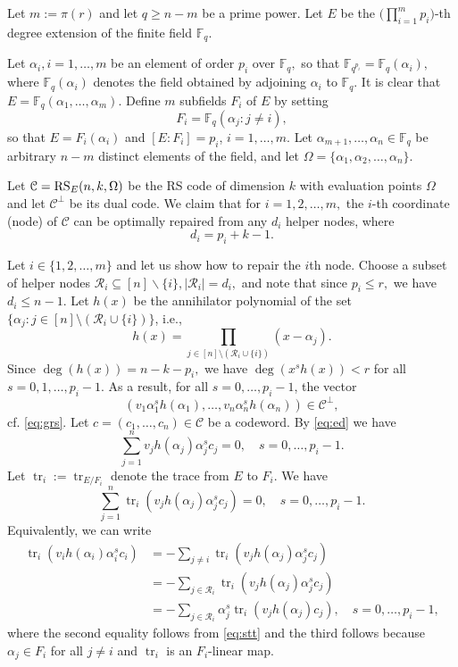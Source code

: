 \documentclass[11pt,onecolumn]{IEEEtran}
\newcommand{\cC}{\mathcal{C}}
\newcommand{\cR}{\mathcal{R}}
\DeclareMathOperator{\trace}{tr}
\begin{document}
\begin{IEEEproof} Let $m:=\pi(r)$ and let $q\ge n-m$ be a prime power. Let $E$ be the $\big(\prod_{i=1}^m p_i\big)$-th degree extension of the finite field $\mathbb{F}_q$. 

Let $\alpha_i, i=1,\dots,m$ be an element of order $p_i$ over $\mathbb{F}_q,$ so that $\mathbb{F}_{q^{p_i}}=\mathbb{F}_q(\alpha_i),$
where $\mathbb{F}_q(\alpha_i)$ denotes the field obtained by adjoining $\alpha_i$ to $\mathbb{F}_q.$ It is clear that $E=
\mathbb{F}_q(\alpha_1,\dots,\alpha_m)$.
Define $m$ subfields $F_i$ of $E$ by setting 
     $$
     F_i=\mathbb{F}_q(\alpha_j:j\neq i),
     $$
 so that $E=F_i(\alpha_i)$ and $[E:F_i]=p_i$, $i=1,\dots,m.$
Let $\alpha_{m+1},\dots,\alpha_{n}\in \mathbb{F}_q$ be arbitrary $n-m$ distinct elements of the field, and let $\Omega=\{\alpha_1,\alpha_2,\dots,\alpha_n\}$.

Let $\cC=\text{\rm RS}_E(n,k,\Omega)$ be the RS code of dimension $k$ with evaluation points $\Omega$ and let $\cC^\bot$ be its dual code.
We claim that for $i=1,2,\dots,m,$ the $i$-th coordinate (node) of $\cC$ can be optimally repaired from any $d_i$ helper nodes, where
$$
d_i= p_i+k-1 .
$$

Let $i\in\{1,2,\dots,m\}$ and let us show how to repair the $i$th node. Choose a subset of helper nodes $\cR_i\subseteq [n]\backslash\{i\},|\cR_i|=d_i,$ and note that since $p_i\leq r,$ we have $d_i\le n-1$.
 Let $h(x)$ be the annihilator polynomial of the set $\{\alpha_j:j\in[n] \setminus(\cR_i \cup \{i\})\}$, i.e., 
\begin{equation}\label{eq:stt}
h(x)=\prod_{j\in[n] \setminus(\cR_i \cup \{i\}) } (x-\alpha_j).
\end{equation}
Since $\deg(h(x))=n-k-p_i,$ we have $\deg(x^s h(x))<r$ for all $s=0,1,\dots,p_i-1.$
As a result, for all $s=0,\dots,p_i-1$, the vector
\begin{equation}\label{eq:ed}
(v_1 \alpha_1^s h(\alpha_1),\dots,v_n \alpha_n^s h(\alpha_n))\in \cC^\bot,
\end{equation}
cf. \eqref{eq:grs}.
Let $c=(c_1,\dots,c_n)\in \cC$ be a codeword. By \eqref{eq:ed} we have
$$
\sum_{j=1}^n v_j h(\alpha_j) \alpha_j^s c_j=0, \quad s=0,\dots,p_i-1.
$$
Let $\trace_i:=\trace_{E/F_i}$ denote the trace from $E$ to $F_i.$ We have
$$
\sum_{j=1}^n\trace_i(v_j h(\alpha_j) \alpha_j^s c_j)=0, \quad s=0,\dots,p_i-1.
$$
Equivalently, we can write
\begin{equation}\label{eq:trg}
\begin{aligned}
\trace_i(v_i h(\alpha_i) \alpha_i^s c_i) & = 
- \sum_{j\neq i}\trace_i(v_j h(\alpha_j) \alpha_j^s c_j) \\
& = - \sum_{j\in \cR_i}\trace_i(v_j h(\alpha_j) \alpha_j^s c_j)  \\
& = - \sum_{j\in \cR_i}  \alpha_j^s \trace_i(v_j h(\alpha_j) c_j),
 \quad s=0,\dots,p_i-1,
\end{aligned}
\end{equation}
where the second equality follows from \eqref{eq:stt} and the third follows because $\alpha_j\in F_i$ for all $j\neq i$ and $\trace_i$ is an $F_i$-linear map.


\end{IEEEproof}
\end{document}
